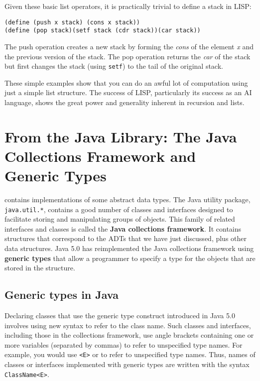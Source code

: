 Given these basic list operators, it is practically trivial to define
a stack in LISP:

\begin{jjjlisting}
\begin{lstlisting}
(define (push x stack) (cons x stack))        
(define (pop stack)(setf stack (cdr stack))(car stack))
\end{lstlisting}
\end{jjjlisting}

\noindent The push operation creates a new stack by forming the {\it cons}
of the element {\it x} and the previous version of the
stack.  The pop operation returns the {\it car} of the stack but
first changes the stack (using {\tt setf}) to the tail of the original
stack.

These simple examples show that you can do an awful lot of computation
using just a simple list structure.  The success of LISP, particularly
its success as an AI language, shows the great power and generality
inherent in recursion and lists.

\section{From the Java Library: The Java Collections Framework and Generic Types}
\label{fromthe-java-library-the-java-collections-frameworkand-generic-types}

\WWWjava

 contains implementations of some
abstract data types.  The Java utility package, {\tt java.util.*},
contains a good number of classes and interfaces designed to
facilitate storing and manipulating groups of objects.  This family of
related interfaces and classes is called the {\bf Java collections
framework}.  It contains structures that correspond to the ADTs that
we have just discussed, plus other data structures.  Java 5.0 has
reimplemented the Java collections framework using {\bf generic types}
that allow a programmer to specify a type for the objects that are
stored in the structure.

\subsection{Generic types in Java}

Declaring classes that use the generic type construct introduced in Java 5.0
involves using new syntax to refer to the class name. Such classes and
interfaces, including those in the collections framework, use angle
brackets containing one or more variables (separated by commas) to
refer to unspecified type names.  For example, you would use {\tt <E>}
or {\tt <K,V>} to refer to unspecified type names. Thus, names of
classes or interfaces implemented with generic types are written with
the syntax {\tt ClassName<E>}.

